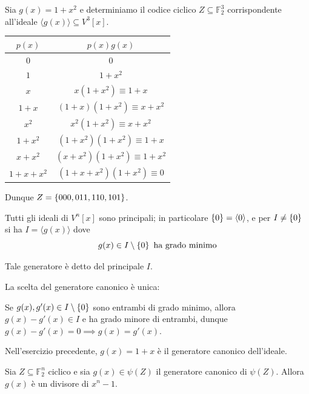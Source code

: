 \begin{example}{}
  Sia \(g(x) = 1 +x^2\) e determiniamo il codice ciclico \(Z \subseteq \mathbb{F}_2^3\) corrispondente all'ideale \(\langle g(x) \rangle \subseteq V^3[x]\).

  \begin{center}
    \begin{tabular}{c | c}
      \(p(x)\) & \(p(x)g(x)\) \\
      \hline
      \(0\) & \(0\) \\
      \(1\) & \(1+x^2\) \\
      \(x\) & \(x(1+x^2) \equiv 1 + x\) \\
      \(1+x\) & \((1+x)(1+x^2) \equiv x + x^2\) \\
      \(x^2\) & \(x^2(1+x^2) \equiv x + x^2\) \\
      \(1+x^2\) & \((1+x^2)(1+x^2) \equiv 1 + x\) \\
      \(x+x^2\) & \((x+x^2)(1+x^2) \equiv 1 + x^2\) \\
      \(1+x+x^2\) & \((1+x+x^2)(1+x^2) \equiv 0\) \\
    \end{tabular}
  \end{center}

  Dunque \(Z = \set{000,011,110,101}\).
\end{example}

\begin{theorem}{}
  Tutti gli ideali di \(V^n[x]\) sono principali; in particolare \(\set{0} = \langle 0 \rangle\), e per \(I \neq \set{0}\) si ha \(I=\langle g(x)\rangle\) dove
  \[g(x) \in I\setminus\set{0} \text{ ha grado minimo}\] 

  Tale generatore è detto  del principale \(I\).
\end{theorem}

\begin{note}{}
  La scelta del generatore canonico è unica:

  Se \(g(x), g'(x) \in I\setminus\set{0}\) sono entrambi di grado minimo, allora \(g(x)-g'(x)\in I\) e ha grado minore di entrambi, dunque \(g(x) - g'(x) = 0 \implies g(x) = g'(x)\).

  Nell'esercizio precedente, \(g(x) = 1 + x\) è il generatore canonico dell'ideale.
\end{note}

\begin{theorem}[label=thm:generator_divisor_zero]{}
  Sia \(Z \subseteq \mathbb{F}_2^n\) ciclico e sia \(g(x) \in \psi(Z)\) il generatore canonico di \(\psi(Z)\).
  Allora \(g(x)\) è un divisore di \(x^n - 1\).
\end{theorem}

